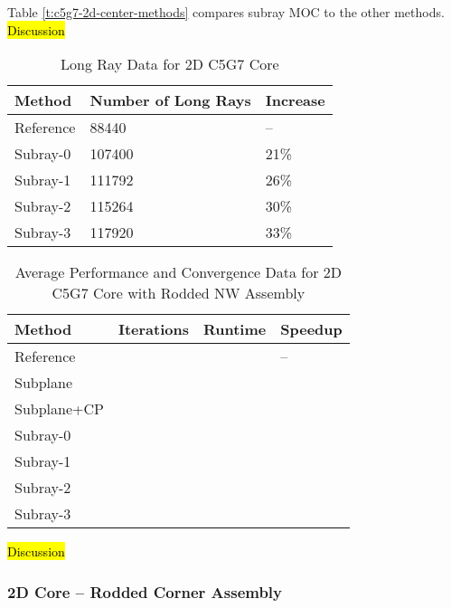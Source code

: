 Table \ref{t:c5g7-2d-center-methods} compares subray MOC to the other methods. \hl{Discussion}

\begin{table}[h]
    \centering
    \caption{Long Ray Data for 2D C5G7 Core}\label{t:subray-data-2dcore}
    \begin{tabular}{l l l }\toprule
        Method & Number of Long Rays & Increase \\\midrule
        Reference & 88440 & -- \\
        Subray-0 & 107400 & 21\% \\
        Subray-1 & 111792 & 26\% \\
        Subray-2 & 115264 & 30\% \\
        Subray-3 & 117920 & 33\% \\
        \bottomrule
    \end{tabular}
\end{table}

\begin{table}[h]
    \centering
    \caption{Average Performance and Convergence Data for 2D C5G7 Core with Rodded NW Assembly}\label{t:subray-performance-2dcoreNW}
    \begin{tabular}{l l l l}\toprule
        Method & Iterations & Runtime & Speedup \\\midrule
        Reference &  &  & -- \\
        Subplane &  &  &  \\
        Subplane+CP &  &  &  \\
        Subray-0 &  &  &  \\
        Subray-1 &  &  &  \\
        Subray-2 &  &  &  \\
        Subray-3 &  &  &  \\
        \bottomrule
    \end{tabular}
\end{table}

\hl{Discussion}

\subsubsection{2D Core -- Rodded Corner Assembly}

